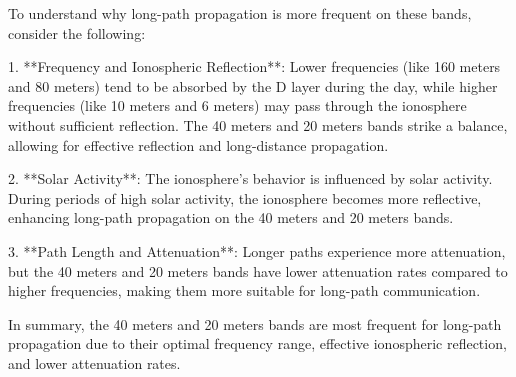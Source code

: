 To understand why long-path propagation is more frequent on these bands, consider the following:

1. **Frequency and Ionospheric Reflection**: Lower frequencies (like 160 meters and 80 meters) tend to be absorbed by the D layer during the day, while higher frequencies (like 10 meters and 6 meters) may pass through the ionosphere without sufficient reflection. The 40 meters and 20 meters bands strike a balance, allowing for effective reflection and long-distance propagation.

2. **Solar Activity**: The ionosphere's behavior is influenced by solar activity. During periods of high solar activity, the ionosphere becomes more reflective, enhancing long-path propagation on the 40 meters and 20 meters bands.

3. **Path Length and Attenuation**: Longer paths experience more attenuation, but the 40 meters and 20 meters bands have lower attenuation rates compared to higher frequencies, making them more suitable for long-path communication.

In summary, the 40 meters and 20 meters bands are most frequent for long-path propagation due to their optimal frequency range, effective ionospheric reflection, and lower attenuation rates.

